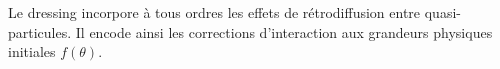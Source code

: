 Le dressing incorpore à tous ordres les effets de rétrodiffusion entre quasi-particules. Il encode ainsi les corrections d’interaction aux grandeurs physiques initiales $f(\theta)$. %
%
%
%
%
%
%
%
%
%
%
%
